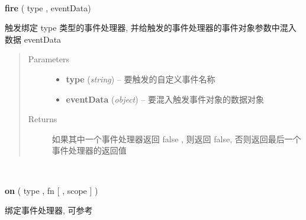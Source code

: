 \documentclass[letterpaper,10pt,english]{sphinxmanual}
\begin{document}
\begin{fulllineitems}
~
\begin{DUlineblock}{0em}
\item[] \textbf{fire} ( type , eventData)
\item[] 触发绑定 type 类型的事件处理器, 并给触发的事件处理器的事件对象参数中混入数据 eventData
\end{DUlineblock}
\begin{quote}\begin{description}
\item[{Parameters}] \leavevmode\begin{itemize}
\item {}
\textbf{type} (\emph{string}) -- 要触发的自定义事件名称

\item {}
\textbf{eventData} (\emph{object}) -- 要混入触发事件对象的数据对象

\end{itemize}

\item[{Returns}] \leavevmode
如果其中一个事件处理器返回 false , 则返回 false, 否则返回最后一个事件处理器的返回值

\end{description}\end{quote}

\end{fulllineitems}




\begin{fulllineitems}
~
\begin{DUlineblock}{0em}
\item[] \textbf{on} ( type , fn {[} , scope {]} )
\item[] 绑定事件处理器, 可参考 {\hyperref[api/core/event/on:Event.on]{}}
\end{DUlineblock}

\end{fulllineitems}
\end{document}

